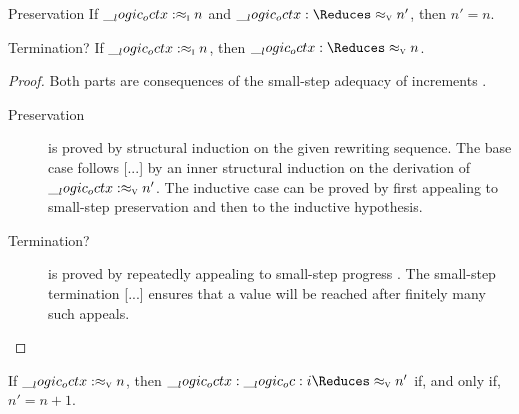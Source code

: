 \begin{theorem}\leavevmode
  \begin{thmdescription}
  \item[Preservation]
    If $\__logic_octx: \approx\sb{\text{\normalfont\scshape i}} n$ and $\octx \Reduces\aval{}{n'}$, then $n' = n$.
  \item[Termination?]
    If $\__logic_octx: \approx\sb{\text{\normalfont\scshape i}} n$, then $\octx \Reduces\aval{}{n}$.
  \end{thmdescription}
\end{theorem}
\begin{proof}
  Both parts are consequences of the small-step adequacy of increments .
  \begin{description}
  \item[Preservation]
    is proved by structural induction on the given rewriting sequence.
    The base case follows [...] by an inner structural induction on the derivation of $\__logic_octx: \approx\sb{\text{\normalfont\scshape v}} n'$.
    The inductive case can be proved by first appealing to small-step preservation  and then to the inductive hypothesis.
  \item[Termination?]
    is proved by repeatedly appealing to small-step progress .
    The small-step termination [...]  ensures that a value will be reached after finitely many such appeals.
  \qedhere
  \end{description}
\end{proof}

\begin{corollary}
  If $\__logic_octx: \approx\sb{\text{\normalfont\scshape v}} n$, then $\octx \oc i \Reduces\aval{}{n'}$ if, and only if, $n' = n+1$.
\end{corollary}






